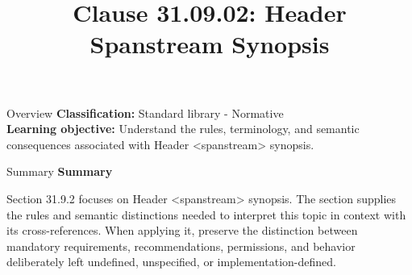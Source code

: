 \documentclass[10pt,letterpaper]{article}
\title{Clause 31.09.02: Header Spanstream Synopsis}
\author{}
\date{}
\begin{document}
\maketitle
\begin{CornellOverviewBox}{Overview}
\textbf{Classification:} Standard library - Normative\\[2pt]
\textbf{Learning objective:} Understand the rules, terminology, and semantic consequences associated with Header <spanstream> synopsis.
\end{CornellOverviewBox}\begin{CornellSummaryBox}{Summary}
{\sffamily\bfseries\color{Accent} Summary}\par\vspace{3pt}Section 31.9.2 focuses on Header <spanstream> synopsis. The section supplies the rules and semantic distinctions needed to interpret this topic in context with its cross-references. When applying it, preserve the distinction between mandatory requirements, recommendations, permissions, and behavior deliberately left undefined, unspecified, or implementation-defined.
\end{CornellSummaryBox}
\end{document}
